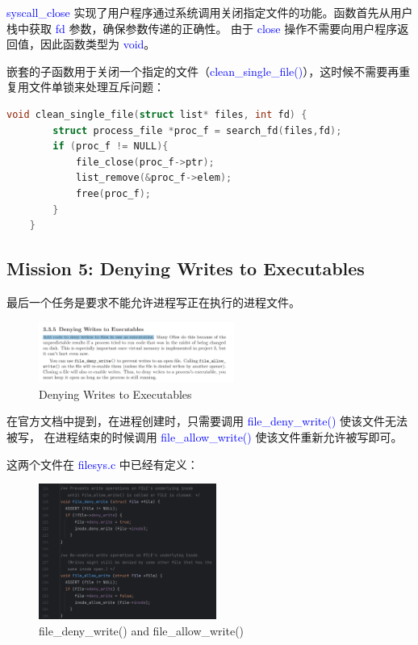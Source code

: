 \documentclass[14pt,a4paper,UTF8,twoside]{article}
\renewcommand{\texttt}[1]{\textcolor{blue}{\ttfamily #1}}
\begin{document}
\begin{ctt}
    \texttt{syscall\_close} 实现了用户程序通过系统调用关闭指定文件的功能。函数首先从用户栈中获取 \texttt{fd} 参数，确保参数传递的正确性。
    由于 \texttt{close} 操作不需要向用户程序返回值，因此函数类型为 \texttt{void}。
\end{ctt}

嵌套的子函数用于关闭一个指定的文件（\texttt{clean\_single\_file()}），这时候不需要再重复用文件单锁来处理互斥问题：

\begin{lstlisting}[language=C]
    void clean_single_file(struct list* files, int fd) {
        struct process_file *proc_f = search_fd(files,fd);
        if (proc_f != NULL){
            file_close(proc_f->ptr);
            list_remove(&proc_f->elem);
            free(proc_f);
        }
    }
\end{lstlisting}

\subsection{Mission 5: Denying Writes to Executables}

最后一个任务是要求不能允许进程写正在执行的进程文件。

\begin{figure}[H]
    \centering
    \includegraphics[width=0.57\textwidth]{img6/denying.png}
    \caption{Denying Writes to Executables}
    \label{fig:deny_writes}
\end{figure}

在官方文档中提到，在进程创建时，只需要调用 \texttt{file\_deny\_write()} 使该文件无法被写，
在进程结束的时候调用 \texttt{file\_allow\_write()} 使该文件重新允许被写即可。

这两个文件在 \texttt{filesys.c} 中已经有定义：

\begin{figure}[H]
    \centering
    \includegraphics[width=0.52\textwidth]{img6/denyandwrite.png}
    \caption{file\_deny\_write() and file\_allow\_write()}
    \label{fig:deny_writes_code}
\end{figure}
\end{document}
